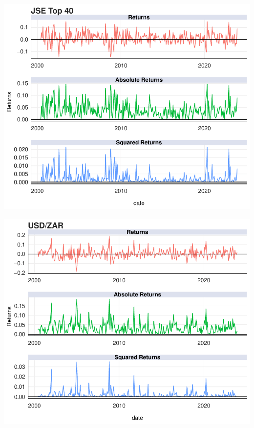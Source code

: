 \documentclass[11pt,preprint, authoryear]{elsarticle}
\let\origfigure\figure
\let\endorigfigure\endfigure
\renewenvironment{figure}[1][2] {
    \expandafter\origfigure\expandafter[H]
} {
    \endorigfigure
}
\numberwithin{equation}{section}
\numberwithin{figure}{section}
\numberwithin{table}{section}
\begin{document}
\begin{figure}[H]

{\centering \includegraphics{Template_files/figure-latex/Figure2-1} 

}

\caption{JSE Top 40 Returns \label{Figure2}}\label{fig:Figure2}
\end{figure}

\begin{figure}[H]

{\centering \includegraphics{Template_files/figure-latex/Figure3-1} 

}

\caption{ZAR/USD Returns \label{Figure3}}\label{fig:Figure3}
\end{figure}
\end{document}
